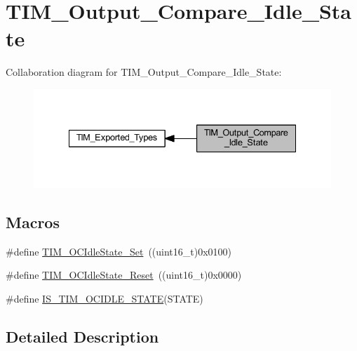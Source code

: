 \hypertarget{group___t_i_m___output___compare___idle___state}{}\section{T\+I\+M\+\_\+\+Output\+\_\+\+Compare\+\_\+\+Idle\+\_\+\+State}
\label{group___t_i_m___output___compare___idle___state}
Collaboration diagram for T\+I\+M\+\_\+\+Output\+\_\+\+Compare\+\_\+\+Idle\+\_\+\+State\+:
\nopagebreak
\begin{figure}[H]
\begin{center}
\leavevmode
\includegraphics[width=335pt]{group___t_i_m___output___compare___idle___state}
\end{center}
\end{figure}
\subsection*{Macros}
\begin{DoxyCompactItemize}
\item 
\#define \hyperlink{group___t_i_m___output___compare___idle___state_ga86d8f895a1ec584323f6c02c7edfad4c}{T\+I\+M\+\_\+\+O\+C\+Idle\+State\+\_\+\+Set}~((uint16\+\_\+t)0x0100)
\item 
\#define \hyperlink{group___t_i_m___output___compare___idle___state_gace5465bc9e90ba7862b3af9e6cc9b97e}{T\+I\+M\+\_\+\+O\+C\+Idle\+State\+\_\+\+Reset}~((uint16\+\_\+t)0x0000)
\item 
\#define \hyperlink{group___t_i_m___output___compare___idle___state_ga69c62dcc15f9d39108b19b64205d689e}{I\+S\+\_\+\+T\+I\+M\+\_\+\+O\+C\+I\+D\+L\+E\+\_\+\+S\+T\+A\+TE}(S\+T\+A\+TE)
\end{DoxyCompactItemize}


\subsection{Detailed Description}


